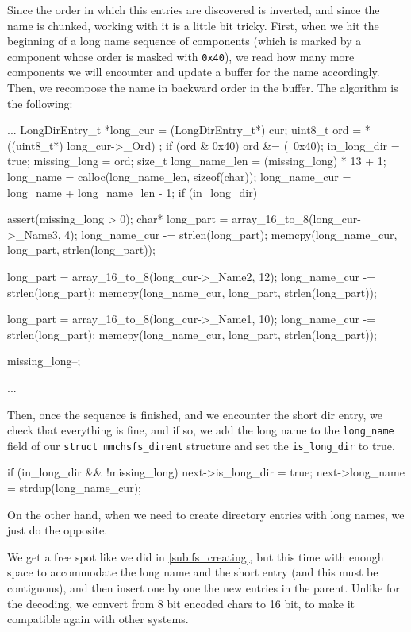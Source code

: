 \documentclass[a4paper,twoside,openright]{report}
\begin{document}
Since the order in which this entries are discovered is inverted, and since the name is chunked, working with it is a little bit tricky.
First, when we hit the beginning of a long name sequence of components (which is marked by a component whose order is masked with \texttt{0x40}), we read how many more components we will encounter and update a buffer for the name accordingly.
Then, we recompose the name in backward order in the buffer. The algorithm is the following:
\begin{pandacode}
...
LongDirEntry_t *long_cur = (LongDirEntry_t*) cur;
uint8_t ord = *((uint8_t*) long_cur->_Ord) ;
if (ord & 0x40) {
    ord &= (~0x40);
    in_long_dir = true;
    missing_long = ord;
    size_t long_name_len = (missing_long) * 13 + 1;
    long_name = calloc(long_name_len, sizeof(char));
    long_name_cur = long_name + long_name_len - 1;
}
if (in_long_dir) {
    assert(missing_long > 0);
    char* long_part = array_16_to_8(long_cur->_Name3, 4);
    long_name_cur -= strlen(long_part);
    memcpy(long_name_cur, long_part, strlen(long_part));

    long_part = array_16_to_8(long_cur->_Name2, 12);
    long_name_cur -= strlen(long_part);
    memcpy(long_name_cur, long_part, strlen(long_part));

    long_part = array_16_to_8(long_cur->_Name1, 10);
    long_name_cur -= strlen(long_part);
    memcpy(long_name_cur, long_part, strlen(long_part));

    missing_long--;
}
...
\end{pandacode} 

Then, once the sequence is finished, and we encounter the short dir entry, we check that everything is fine, and if so, we add the long name to the \texttt{long\_name} field of our \texttt{struct mmchsfs\_dirent} structure and set the \texttt{is\_long\_dir} to true.
\begin{pandacode}
if (in_long_dir && !missing_long) {
    next->is_long_dir = true;
    next->long_name = strdup(long_name_cur);
}
\end{pandacode} 

On the other hand, when we need to create directory entries with long names, we just do the opposite.

We get a free spot like we did in \ref{sub:fs_creating}, but this time with enough space to accommodate the long name and the short entry (and this must be contiguous), and then insert one by one the new entries in the parent.
Unlike for the decoding, we convert from 8 bit encoded chars to 16 bit, to make it compatible again with other systems.
\end{document}
